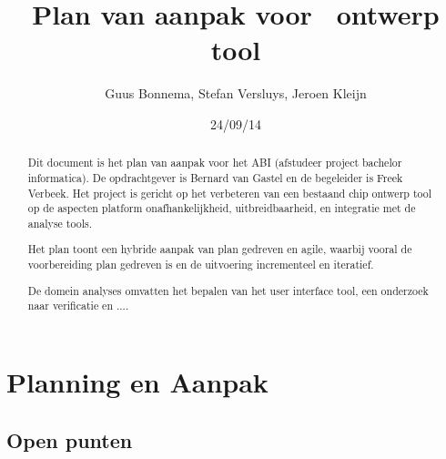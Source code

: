 \documentclass[a4paper,11pt]{article}
\author{Guus Bonnema, Stefan Versluys, Jeroen Kleijn}
\date{24/09/14}
\title{Plan van aanpak voor \xmas\ ontwerp tool}
\begin{document}

\newcommand{\xmas}{x\textsc{mas}}%

\maketitle

\listoftodos

\begin{abstract}
 Dit document is het plan van aanpak voor het ABI (afstudeer project bachelor
 informatica). De opdrachtgever is Bernard van Gastel en de begeleider is
 Freek Verbeek. Het project is gericht op het verbeteren van een bestaand
 chip ontwerp tool op de aspecten platform onafhankelijkheid, uitbreidbaarheid,
 en integratie met de analyse tools.

 Het plan toont een hybride aanpak van plan gedreven en agile, waarbij vooral
 de voorbereiding plan gedreven is en de uitvoering incrementeel en iteratief.

 De domein analyses omvatten het bepalen van het user interface tool,
 een onderzoek naar verificatie en ....
\end{abstract}






\section{Planning en Aanpak}




\subsection{Open punten}
\end{document}
